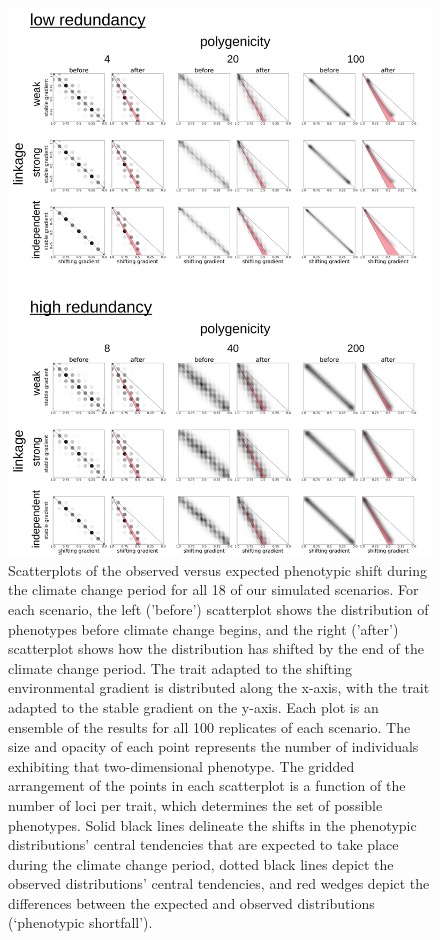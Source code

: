\documentclass[9pt,twocolumn,twoside,lineno]{pnas-new}
\begin{document}
\begin{figure}
\centering
\includegraphics[width=15.8cm]{pub/figs_and_stats/FIG_4_phenotypic_shift.jpg}
\caption{Scatterplots of the observed versus expected phenotypic shift during the climate change period for all 18 of our simulated scenarios. For each scenario, the left ('before') scatterplot shows the distribution of phenotypes before climate change begins, and the right ('after') scatterplot shows how the distribution has shifted by the end of the climate change period. The trait adapted to the shifting environmental gradient is distributed along the x-axis, with the trait adapted to the stable gradient on the y-axis. Each plot is an ensemble of the results for all 100 replicates of each scenario. The size and opacity of each point represents the number of individuals exhibiting that two-dimensional phenotype. The gridded arrangement of the points in each scatterplot is a function of the number of loci per trait, which determines the set of possible phenotypes. Solid black lines delineate the shifts in the phenotypic distributions’ central tendencies that are expected to take place during the climate change period, dotted black lines depict the observed distributions’ central tendencies, and red wedges depict the differences between the expected and observed distributions (‘phenotypic shortfall’).
}
\label{fig:fig_4}
\end{figure}
\end{document}
